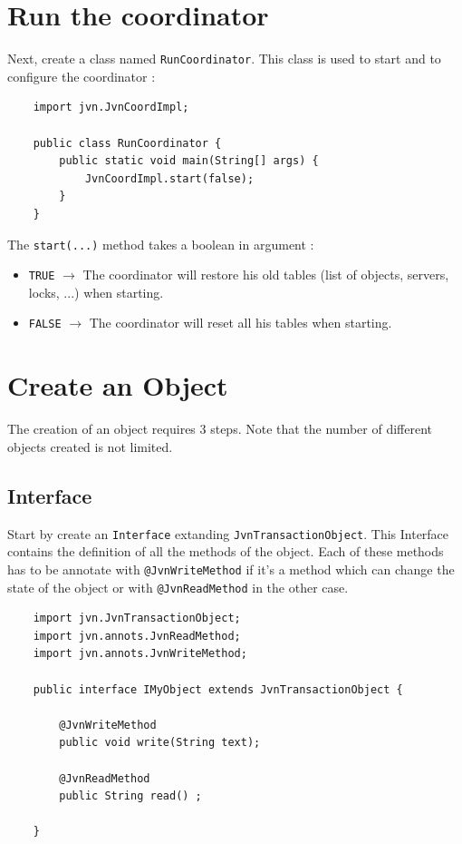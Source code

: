 \documentclass{article}
\begin{document}
\section{Run the coordinator}

Next, create a class named \texttt{RunCoordinator}. This class is used to start and to configure the coordinator : \\

\noindent
\begin{verbatim}
    import jvn.JvnCoordImpl;

    public class RunCoordinator {
        public static void main(String[] args) {
            JvnCoordImpl.start(false);
        }
    }
\end{verbatim}
\vspace{0.3cm}

\noindent The \texttt{start(...)} method takes a boolean in argument :

\begin{itemize}
\item \texttt{TRUE} $\rightarrow$ The coordinator will restore his old tables (list of objects, servers, locks, ...) when starting.
\item \texttt{FALSE} $\rightarrow$ The coordinator will reset all his tables when starting.
\end{itemize}

\section{Create an Object}

The creation of an object requires 3 steps. Note that the number of different objects created is not limited.

\subsection{Interface}

Start by create an \texttt{Interface} extanding \texttt{JvnTransactionObject}. This Interface contains the definition of all the methods of the object. Each of these methods has to be annotate with \texttt{@JvnWriteMethod} if it's a method which can change the state of the object or with \texttt{@JvnReadMethod} in the other case. \\

\noindent
\begin{verbatim}
    import jvn.JvnTransactionObject;
    import jvn.annots.JvnReadMethod;
    import jvn.annots.JvnWriteMethod;

    public interface IMyObject extends JvnTransactionObject {
	
        @JvnWriteMethod
        public void write(String text);
	
        @JvnReadMethod
        public String read() ;
	
    }
\end{verbatim}
\end{document}
